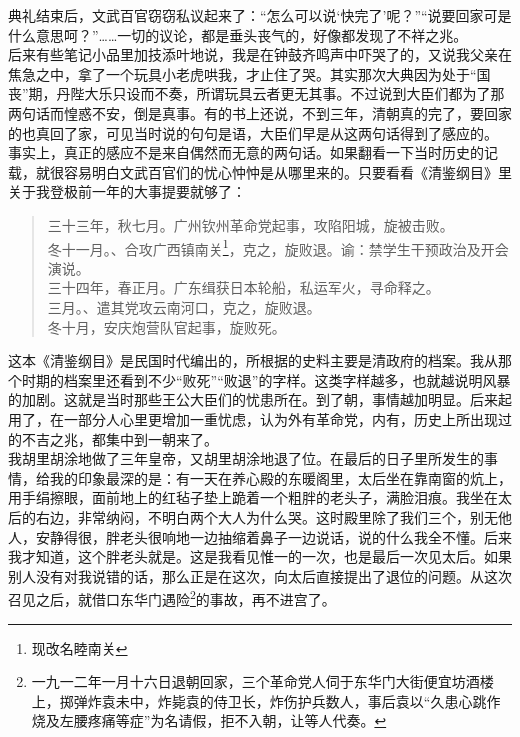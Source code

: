 典礼结束后，文武百官窃窃私议起来了：“怎么可以说‘快完了’呢？”“说要回家可是什么意思呵？”……一切的议论，都是垂头丧气的，好像都发现了不祥之兆。\\

后来有些笔记小品里加技添叶地说，我是在钟鼓齐鸣声中吓哭了的，又说我父亲在焦急之中，拿了一个玩具小老虎哄我，才止住了哭。其实那次大典因为处于“国丧”期，丹陛大乐只设而不奏，所谓玩具云者更无其事。不过说到大臣们都为了那两句话而惶惑不安，倒是真事。有的书上还说，不到三年，清朝真的完了，要回家的也真回了家，可见当时说的句句是语，大臣们早是从这两句话得到了感应的。\\

事实上，真正的感应不是来自偶然而无意的两句话。如果翻看一下当时历史的记载，就很容易明白文武百官们的忧心忡忡是从哪里来的。只要看看《清鉴纲目》里关于我登极前一年的大事提要就够了：\\

\begin{quote}
	三十三年，秋七月。广州钦州革命党起事，攻陷阳城，旋被击败。\\

冬十一月。、合攻广西镇南关\footnote{现改名睦南关}，克之，旋败退。谕：禁学生干预政治及开会演说。\\

三十四年，春正月。广东缉获日本轮船，私运军火，寻命释之。\\

三月。、遣其党攻云南河口，克之，旋败退。\\

冬十月，安庆炮营队官起事，旋败死。\\
\end{quote}

这本《清鉴纲目》是民国时代编出的，所根据的史料主要是清政府的档案。我从那个时期的档案里还看到不少“败死”“败退”的字样。这类字样越多，也就越说明风暴的加剧。这就是当时那些王公大臣们的忧患所在。到了朝，事情越加明显。后来起用了，在一部分人心里更增加一重忧虑，认为外有革命党，内有，历史上所出现过的不吉之兆，都集中到一朝来了。\\

我胡里胡涂地做了三年皇帝，又胡里胡涂地退了位。在最后的日子里所发生的事情，给我的印象最深的是：有一天在养心殿的东暖阁里，太后坐在靠南窗的炕上，用手绢擦眼，面前地上的红毡子垫上跪着一个粗胖的老头子，满脸泪痕。我坐在太后的右边，非常纳闷，不明白两个大人为什么哭。这时殿里除了我们三个，别无他人，安静得很，胖老头很响地一边抽缩着鼻子一边说话，说的什么我全不懂。后来我才知道，这个胖老头就是。这是我看见惟一的一次，也是最后一次见太后。如果别人没有对我说错的话，那么正是在这次，向太后直接提出了退位的问题。从这次召见之后，就借口东华门遇险\footnote{一九一二年一月十六日退朝回家，三个革命党人伺于东华门大街便宜坊酒楼上，掷弹炸袁未中，炸毙袁的侍卫长，炸伤护兵数人，事后袁以“久患心跳作烧及左腰疼痛等症”为名请假，拒不入朝，让等人代奏。}的事故，再不进宫了。\\

